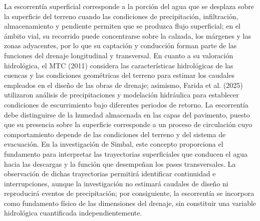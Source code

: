 La escorrentía superficial corresponde a la porción del agua que se desplaza sobre la superficie del terreno cuando las condiciones de precipitación, infiltración, almacenamiento y pendiente permiten que se produzca flujo superficial; en el ámbito vial, su recorrido puede concentrarse sobre la calzada, los márgenes y las zonas adyacentes, por lo que su captación y conducción forman parte de las funciones del drenaje longitudinal y transversal. En cuanto a su valoración hidrológica, el MTC (2011) considera las características hidrológicas de las cuencas y las condiciones geométricas del terreno para estimar los caudales empleados en el diseño de las obras de drenaje; asimismo, Farida et al. (2025) utilizaron análisis de precipitaciones y modelación hidráulica para establecer condiciones de escurrimiento bajo diferentes periodos de retorno. La escorrentía debe distinguirse de la humedad almacenada en las capas del pavimento, puesto que su presencia sobre la superficie corresponde a un proceso de circulación cuyo comportamiento depende de las condiciones del terreno y del sistema de evacuación. En la investigación de Simbal, este concepto proporciona el fundamento para interpretar las trayectorias superficiales que conducen el agua hacia las descargas y la función que desempeñan los pases transversales. La observación de dichas trayectorias permitirá identificar continuidad e interrupciones, aunque la investigación no estimará caudales de diseño ni reproducirá eventos de precipitación; por consiguiente, la escorrentía se incorpora como fundamento físico de las dimensiones del drenaje, sin constituir una variable hidrológica cuantificada independientemente.


